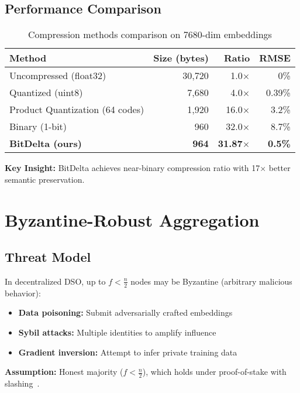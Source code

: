 \documentclass[11pt,a4paper]{article}
\begin{document}
\subsection{Performance Comparison}

\begin{table}[h]
\centering
\caption{Compression methods comparison on 7680-dim embeddings}
\begin{tabular}{lrrr}
\toprule
\textbf{Method} & \textbf{Size (bytes)} & \textbf{Ratio} & \textbf{RMSE} \\
\midrule
Uncompressed (float32) & 30,720 & 1.0$\times$ & 0\% \\
Quantized (uint8) & 7,680 & 4.0$\times$ & 0.39\% \\
Product Quantization (64 codes) & 1,920 & 16.0$\times$ & 3.2\% \\
Binary (1-bit) & 960 & 32.0$\times$ & 8.7\% \\
\textbf{BitDelta (ours)} & \textbf{964} & \textbf{31.87$\times$} & \textbf{0.5\%} \\
\bottomrule
\end{tabular}
\end{table}

\textbf{Key Insight:} BitDelta achieves near-binary compression ratio with 17$\times$ better semantic preservation.

\section{Byzantine-Robust Aggregation}

\subsection{Threat Model}

In decentralized DSO, up to $f < \frac{n}{2}$ nodes may be Byzantine (arbitrary malicious behavior):
\begin{itemize}
\item \textbf{Data poisoning:} Submit adversarially crafted embeddings
\item \textbf{Sybil attacks:} Multiple identities to amplify influence
\item \textbf{Gradient inversion:} Attempt to infer private training data
\end{itemize}

\textbf{Assumption:} Honest majority ($f < \frac{n}{2}$), which holds under proof-of-stake with slashing~\cite{buterin2017casper}.
\end{document}
